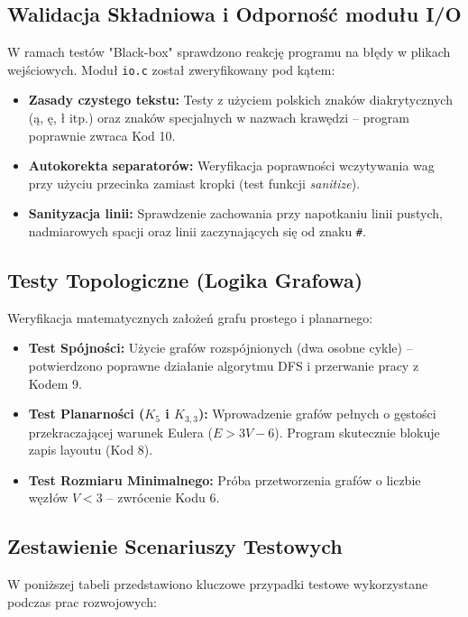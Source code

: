 \documentclass[12pt,a4paper]{article}
\begin{document}
\subsection{Walidacja Składniowa i Odporność modułu I/O}
W ramach testów "Black-box" sprawdzono reakcję programu na błędy w plikach wejściowych. Moduł \texttt{io.c} został zweryfikowany pod kątem:
\begin{itemize}[label=\textbullet]
    \item \textbf{Zasady czystego tekstu:} Testy z użyciem polskich znaków diakrytycznych (ą, ę, ł itp.) oraz znaków specjalnych w nazwach krawędzi – program poprawnie zwraca Kod 10.
    \item \textbf{Autokorekta separatorów:} Weryfikacja poprawności wczytywania wag przy użyciu przecinka zamiast kropki (test funkcji \textit{sanitize}).
    \item \textbf{Sanityzacja linii:} Sprawdzenie zachowania przy napotkaniu linii pustych, nadmiarowych spacji oraz linii zaczynających się od znaku \texttt{\#}.
\end{itemize}

\subsection{Testy Topologiczne (Logika Grafowa)}
Weryfikacja matematycznych założeń grafu prostego i planarnego:
\begin{itemize}[label=\textbullet]
    \item \textbf{Test Spójności:} Użycie grafów rozspójnionych (dwa osobne cykle) – potwierdzono poprawne działanie algorytmu DFS i przerwanie pracy z Kodem 9.
    \item \textbf{Test Planarności ($K_5$ i $K_{3,3}$):} Wprowadzenie grafów pełnych o gęstości przekraczającej warunek Eulera ($E > 3V - 6$). Program skutecznie blokuje zapis layoutu (Kod 8).
    \item \textbf{Test Rozmiaru Minimalnego:} Próba przetworzenia grafów o liczbie węzłów $V < 3$ – zwrócenie Kodu 6.
\end{itemize}



\subsection{Zestawienie Scenariuszy Testowych}
W poniższej tabeli przedstawiono kluczowe przypadki testowe wykorzystane podczas prac rozwojowych:
\end{document}
